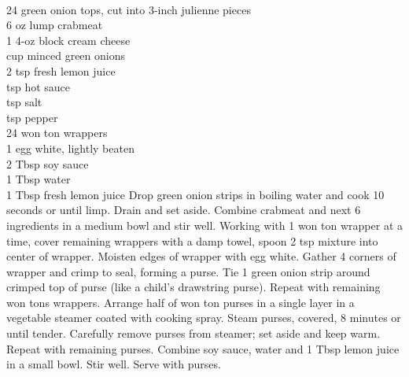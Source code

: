 \begin{minipage}{\linewidth}
\end{minipage}\par\begin{minipage}{\linewidth} 
 \\
	\step
	{24 green onion tops, cut into 3-inch julienne pieces	 \\
	 6 oz lump crabmeat	 \\
	 1  4-oz block cream cheese \\	
	  cup minced green onions	 \\
	 2 tsp fresh lemon juice \\
	  tsp hot sauce	 \\
	  tsp salt \\
	  tsp pepper	 \\
	 24 won ton wrappers \\
	 1 egg white, lightly beaten	 \\
	 2 Tbsp soy sauce \\
	 1 Tbsp water	 \\
	 1 Tbsp fresh lemon juice	
		}{
Drop green onion strips in boiling water and cook 10 seconds or until limp. Drain and set aside. Combine crabmeat and next 6 ingredients in a medium bowl and stir well. Working with 1 won ton wrapper at a time, cover remaining wrappers with a damp towel, spoon 2 tsp mixture into center of wrapper. Moisten edges of wrapper with egg white. Gather 4 corners of wrapper and crimp to seal, forming a purse. Tie 1 green onion strip around crimped top of purse (like a child's drawstring purse). Repeat with remaining won tons wrappers. Arrange half of won ton purses in a single layer in a vegetable steamer coated with cooking spray. Steam purses, covered, 8 minutes or until tender. Carefully remove purses from steamer; set aside and keep warm. Repeat with remaining purses. Combine soy sauce, water and 1 Tbsp lemon juice in a small bowl. Stir well. Serve with purses.}

\end{minipage}\par\begin{minipage}{\linewidth}  
\\


\end{minipage}
